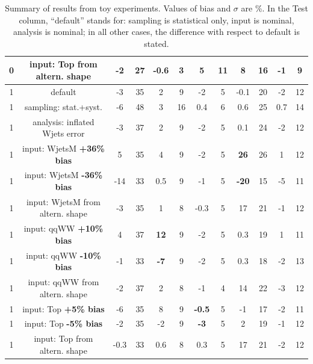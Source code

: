 \begin{table}
\begin{center}
\begin{tabular}{c | c  | c c | c c | c c | c c | c c }
0 & input: Top from altern. shape       & -2  & 27  & -0.6 & 3 & 5        & 11  & 8    & 16  & -1   & 9\\
\hline
\hline
1 & default                             & -3  & 35 & 2   & 9  & -2  & 5 & -0.1 & 20 & -2 & 12 \\
1 & sampling: stat.+syst.               & -6  & 48 & 3   & 16 & 0.4 & 6 & 0.6  & 25 & 0.7& 14 \\
\hline
1 & analysis: inflated Wjets error      &  -3 &  37 & 2  & 9 & -2   & 5  & 0.1      & 24  & -2  & 12 \\ 
1 & input: WjetsM {\bf +36\% bias}      &  5  &  35 & 4  & 9 & -2   & 5  & {\bf 26} & 26  & 1   & 12 \\ 
1 & input: WjetsM {\bf -36\% bias}      & -14 &  33 & 0.5& 9 & -1   & 5  & {\bf-20} & 15  & -5  & 11 \\ 
1 & input: WjetsM from altern. shape    &  -3 &  35 & 1  & 8 & -0.3 & 5  & 17       & 21  & -1  & 12 \\
\hline
1 & input: qqWW {\bf +10\% bias}        & 4   & 37 & {\bf 12} & 9 & -2  & 5  & 0.3  & 19 & 1  & 11 \\
1 & input: qqWW {\bf -10\% bias}        & -1  & 33 & {\bf -7} & 9 & -2  & 5  & 0.3  & 18 & -2 & 13 \\
1 & input: qqWW from altern. shape      & -2  & 37 & 2        & 8 & -1  & 4  & 14   & 22 & -3 & 12 \\
\hline
1 & input: Top {\bf +5\% bias}          & -6   & 35  & 8   & 9 & {\bf -0.5} & 5 & -1 & 17 & -2 & 11 \\
1 & input: Top {\bf -5\% bias}          & -2   & 35  & -2  & 9 & {\bf -3}   & 5 & 2  & 19 & -1 & 12 \\
1 & input: Top from altern. shape       & -0.3 & 33  & 0.6 & 8 & 0.3        & 5 & 17 & 21 & -2 & 12 \\
\hline
\hline
\end{tabular}
\caption{Summary of results from toy experiments. Values of bias and $\sigma$ are \%.
In the Test column, ``default'' stands for: sampling is statistical only, input is nominal, analysis is nominal; 
in all other cases, the difference with respect to default is stated.}
\label{tab:toy_summary}
\end{center}
\end{table}


